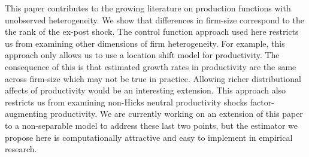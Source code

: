 \documentclass[11pt]{article}
\begin{document}
This paper contributes to the growing literature on production functions with unobserved heterogeneity. We show that differences in firm-size correspond to the the rank of the ex-post shock. The control function approach used here restricts us from examining other dimensions of firm heterogeneity. For example, this approach only allows us to use a location shift model for productivity. The consequence of this is that estimated growth rates in productivity are the same across firm-size which may not be true in practice. Allowing richer distributional affects of productivity would be an interesting extension. This approach also restricts us from examining non-Hicks neutral productivity shocks factor-augmenting productivity. We are currently working on an extension of this paper to a non-separable model to address these last two points, but the estimator we propose here is computationally attractive and easy to implement in empirical research.    




\pagebreak
\newpage











\end{document}
